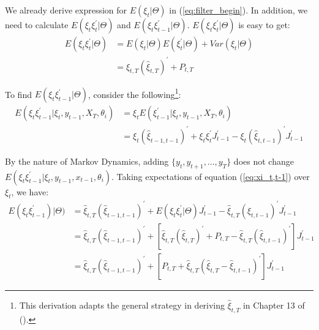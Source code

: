 \documentclass[12pt]{article}
\numberwithin{equation}{section}
\begin{document}
We already derive expression for $E(\xi_t|\Theta)$ in (\ref{eq:filter_begin}). In addition, we need to calculate $E(\xi_t\xi_t^{'}|\Theta)$ and $E(\xi_t\xi_{t-1}^{'}|\Theta)$. $E(\xi_t\xi_t^{'}|\Theta)$ is easy to  get:
\begin{align*}
    E(\xi_t\xi_t^{'}|\Theta) & = E(\xi_t|\Theta)E(\xi_t^{'}|\Theta) + Var(\xi_t|\Theta) \\
    &= \hat{\xi}_{t,T}(\hat{\xi}_{t,T})^{'} + P_{t,T}
\end{align*}

To find $E(\xi_t\xi_{t-1}^{'}|\Theta)$, consider the following\footnote{This derivation adapts the general strategy in deriving $\hat{\xi}_{t,T}$ in Chapter 13 of (\cite{hamilton_1994}).}:
\begin{align}
    E(\xi_t\xi_{t-1}^{'}|\xi_t,y_{t-1},X_T,\theta_i) &= \xi_tE(\xi_{t-1}^{'}|\xi_t,y_{t-1},X_T,\theta_i) \nonumber \\
    &= \xi_t(\hat{\xi}_{t-1,t-1})^{'} + \xi_t\xi_t^{'}J_{t-1}^{'} - \xi_{t}(\hat{\xi}_{t,t-1})^{'}J_{t-1}^{'} \label{eq:xi_t,t-1}
\end{align}

By the nature of Markov Dynamics, adding $\{y_t, y_{t+1}, ..., y_T\}$ does not change $E(\xi_t\xi_{t-1}^{'}|\xi_t,y_{t-1},x_{t-1},\theta_i)$. Taking expectations of equation (\ref{eq:xi_t,t-1}) over $\xi_t$, we have:
\begin{align*}
    E(\xi_t\xi_{t-1}^{'})|\Theta) &= \hat{\xi}_{t,T}(\hat{\xi}_{t-1,t-1})^{'} + E(\xi_t\xi_t^{'}|\Theta)J_{t-1}^{'}
    -\hat{\xi}_{t,T}(\hat{\xi}_{t,t-1})^{'}J_{t-1}^{'} \\
    &= \hat{\xi}_{t,T}(\hat{\xi}_{t-1,t-1})^{'} + [\hat{\xi}_{t,T}(\hat{\xi}_{t,T})^{'} + P_{t,T} 
    -\hat{\xi}_{t,T}(\hat{\xi}_{t,t-1})^{'}]J_{t-1}^{'} \\
    &= \hat{\xi}_{t,T}(\hat{\xi}_{t-1,t-1})^{'} + [P_{t,T} + \hat{\xi}_{t,T}(\hat{\xi}_{t,T}-\hat{\xi}_{t,t-1})^{'}]J_{t-1}^{'}
\end{align*}
\end{document}
